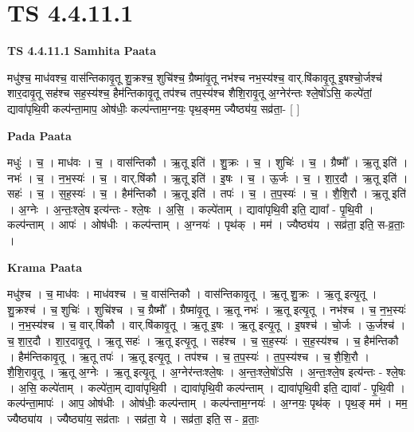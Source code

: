 \documentclass[17pt]{extarticle}
\begin{document}
\section{ TS 4.4.11.1 }

\textbf{TS 4.4.11.1 } \newline
\textbf{Samhita Paata} \newline

मधु॑श्च॒ माध॑वश्च॒ वास॑न्तिकावृ॒तू शु॒क्रश्च॒ शुचि॑श्च॒ ग्रैष्मा॑वृ॒तू नभ॑श्च नभ॒स्य॑श्च॒ वार्.षि॑कावृ॒तू इ॒षश्चो॒र्जश्च॑ शार॒दावृ॒तू सह॑श्च सह॒स्य॑श्च॒ हैम॑न्तिकावृ॒तू तप॑श्च तप॒स्य॑श्च शैशि॒रावृ॒तू अ॒ग्नेर॑न्तः श्ले॒षो॑ऽसि॒ कल्पे॑तां॒ द्यावा॑पृथि॒वी कल्प॑न्ता॒माप॒ ओष॑धीः॒ कल्प॑न्ताम॒ग्नयः॒ पृथ॒ङ्मम॒ ज्यैष्ठ्य॑य॒ सव्र॑ता॒- [  ] \newline

\textbf{Pada Paata} \newline

मधुः॑ । च॒ । माध॑वः । च॒ । वास॑न्तिकौ । ऋ॒तू इति॑ । शु॒क्रः । च॒ । शुचिः॑ । च॒ । ग्रैष्मौ᳚ । ऋ॒तू इति॑ । नभः॑ । च॒ । न॒भ॒स्यः॑ । च॒ । वार्.षि॑कौ । ऋ॒तू इति॑ । इ॒षः । च॒ । ऊ॒र्जः । च॒ । शा॒र॒दौ । ऋ॒तू इति॑ । सहः॑ । च॒ । स॒ह॒स्यः॑ । च॒ । हैम॑न्तिकौ । ऋ॒तू इति॑ । तपः॑ । च॒ । त॒प॒स्यः॑ । च॒ । शै॒शि॒रौ । ऋ॒तू इति॑ । अ॒ग्नेः । अ॒न्तः॒श्ले॒ष इत्य॑न्तः - श्ले॒षः । अ॒सि॒ । कल्पे॑ताम् । द्यावा॑पृथि॒वी इति॒ द्यावा᳚ - पृ॒थि॒वी । कल्प॑न्ताम् । आपः॑ । ओष॑धीः । कल्प॑न्ताम् । अ॒ग्नयः॑ । पृथ॑क् । मम॑ । ज्यैष्ठ्य॑य । सव्र॑ता॒ इति॒ स-व्र॒ताः॒ ।  \newline


\textbf{Krama Paata} \newline

मधु॑श्च । च॒ माध॑वः । माध॑वश्च । च॒ वास॑न्तिकौ । वास॑न्तिकावृ॒तू । ऋ॒तू शु॒क्रः । ऋ॒तू इत्यृ॒तू । शु॒क्रश्च॑ । च॒ शुचिः॑ । शुचि॑श्च । च॒ ग्रैष्मौ᳚ । ग्रैष्मा॑वृ॒तू । ऋ॒तू नभः॑ । ऋ॒तू इत्यृ॒तू । नभ॑श्च । च॒ न॒भ॒स्यः॑ । न॒भ॒स्य॑श्च । च॒ वार्.षि॑कौ । वार्.षि॑कावृ॒तू । ऋ॒तू इ॒षः । ऋ॒तू इत्यृ॒तू । इ॒षश्च॑ । चो॒र्जः । ऊ॒र्जश्च॑ । च॒ शा॒र॒दौ । शा॒र॒दावृ॒तू । ऋ॒तू सहः॑ । ऋ॒तू इत्यृ॒तू । सह॑श्च । च॒ स॒ह॒स्यः॑ । स॒ह॒स्य॑श्च । च॒ हैम॑न्तिकौ । हैम॑न्तिकावृ॒तू । ऋ॒तू तपः॑ । ऋ॒तू इत्यृ॒तू । तप॑श्च । च॒ त॒प॒स्यः॑ । त॒प॒स्य॑श्च । च॒ शै॒शि॒रौ । शै॒शि॒रावृ॒तू । ऋ॒तू अ॒ग्नेः । ऋ॒तू इत्यृ॒तू । अ॒ग्नेर॑न्तःश्ले॒षः । अ॒न्तः॒श्ले॒षो॑ऽसि । अ॒न्तः॒श्ले॒ष इत्य॑न्तः - श्ले॒षः । अ॒सि॒ कल्पे॑ताम् । कल्पे॑ता॒म् द्यावा॑पृथि॒वी । द्यावा॑पृथि॒वी कल्प॑न्ताम् । द्यावा॑पृथि॒वी इति॒ द्यावा᳚ - पृ॒थि॒वी । कल्प॑न्ता॒मापः॑ । आप॒ ओष॑धीः । ओष॑धीः॒ कल्प॑न्ताम् । कल्प॑न्ताम॒ग्नयः॑ । अ॒ग्नयः॒ पृथ॑क् । पृथ॒ङ् मम॑ । मम॒ ज्यैष्ठ्या॑य । ज्यैष्ठ्या॑य॒ सव्र॑ताः । सव्र॑ता॒ ये । सव्र॑ता॒ इति॒ स - व्र॒ताः॒ \newline
\end{document}
